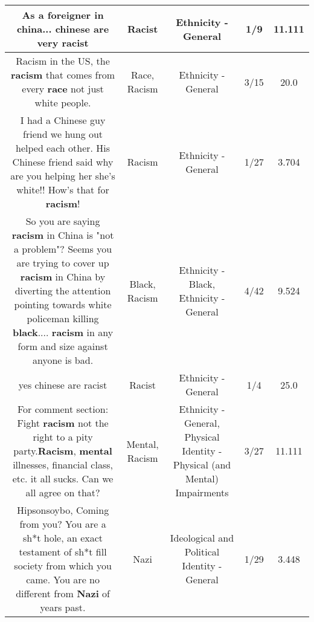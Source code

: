 \documentclass[11pt]{article}
\newlength\mylength
\begin{document}
\begin{center}
\begin{longtable}{|C{.65\mylength}|C{.30\mylength}|C{.12\mylength}|C{.12\mylength}|C{.12\mylength}|}
  \small As a foreigner in china... chinese are very racist\normalsize   & Racist & Ethnicity - General & 1/9 & 11.111 \\  \hline
  \small Racism in the US, the \textbf{racism} that comes from every \textbf{race} not just white people.\normalsize   & Race, Racism & Ethnicity - General & 3/15 & 20.0 \\  \hline
  \small I had a Chinese guy friend we hung out helped each other. His Chinese friend said why are you helping her she's white!! How's that for \textbf{racism}!\normalsize   & Racism & Ethnicity - General & 1/27 & 3.704 \\  \hline
  \small {} So you are saying \textbf{racism} in China is "not a problem"? Seems you are trying to cover up \textbf{racism} in China by diverting the attention pointing towards white policeman killing  \textbf{black}.... \textbf{racism} in any form and size against anyone is bad.\normalsize   & Black, Racism & Ethnicity - Black, Ethnicity - General & 4/42 & 9.524 \\  \hline
  \small yes chinese are racist\normalsize   & Racist & Ethnicity - General & 1/4 & 25.0 \\  \hline
  \small For comment section: Fight \textbf{racism} not the right to a pity party.\textbf{Racism}, \textbf{mental} illnesses, financial class, etc. it all sucks. Can we all agree on that?\normalsize   & Mental, Racism & Ethnicity - General, Physical Identity - Physical (and Mental) Impairments & 3/27 & 11.111 \\  \hline
  \small Hipsonsoybo, Coming from you? You are a sh*t hole, an exact testament of sh*t fill society from which you came. You are no different from \textbf{Nazi} of years past.\normalsize   & Nazi &  Ideological and Political Identity - General & 1/29 & 3.448 \\  \hline

\end{longtable}
\end{center}
\end{document}
